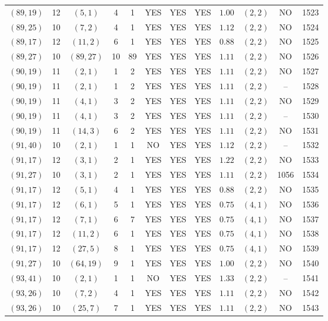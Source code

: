 \begin{longtable}{|c|c|c|c|c|c|c|c|c|c|c|c|}
$(89,19)$ & 12 & $(5,1)$ & 4 & 1 & YES & YES & YES & $1.00$ & $(2,2)$ & NO & 1523\\
$(89,25)$ & 10 & $(7,2)$ & 4 & 1 & YES & YES & YES & $1.12$ & $(2,2)$ & NO & 1524\\
$(89,17)$ & 12 & $(11,2)$ & 6 & 1 & YES & YES & YES & $0.88$ & $(2,2)$ & NO & 1525\\
$(89,27)$ & 10 & $(89,27)$ & 10 & 89 & YES & YES & YES & $1.11$ & $(2,2)$ & NO & 1526\\
$(90,19)$ & 11 & $(2,1)$ & 1 & 2 & YES & YES & YES & $1.11$ & $(2,2)$ & NO & 1527\\
$(90,19)$ & 11 & $(2,1)$ & 1 & 2 & YES & YES & YES & $1.11$ & $(2,2)$ & -- & 1528\\
$(90,19)$ & 11 & $(4,1)$ & 3 & 2 & YES & YES & YES & $1.11$ & $(2,2)$ & NO & 1529\\
$(90,19)$ & 11 & $(4,1)$ & 3 & 2 & YES & YES & YES & $1.11$ & $(2,2)$ & -- & 1530\\
$(90,19)$ & 11 & $(14,3)$ & 6 & 2 & YES & YES & YES & $1.11$ & $(2,2)$ & NO & 1531\\
$(91,40)$ & 10 & $(2,1)$ & 1 & 1 & NO & YES & YES & $1.12$ & $(2,2)$ & -- & 1532\\
$(91,17)$ & 12 & $(3,1)$ & 2 & 1 & YES & YES & YES & $1.22$ & $(2,2)$ & NO & 1533\\
$(91,27)$ & 10 & $(3,1)$ & 2 & 1 & YES & YES & YES & $1.11$ & $(2,2)$ & 1056 & 1534\\
$(91,17)$ & 12 & $(5,1)$ & 4 & 1 & YES & YES & YES & $0.88$ & $(2,2)$ & NO & 1535\\
$(91,17)$ & 12 & $(6,1)$ & 5 & 1 & YES & YES & YES & $0.75$ & $(4,1)$ & NO & 1536\\
$(91,17)$ & 12 & $(7,1)$ & 6 & 7 & YES & YES & YES & $0.75$ & $(4,1)$ & NO & 1537\\
$(91,17)$ & 12 & $(11,2)$ & 6 & 1 & YES & YES & YES & $0.75$ & $(4,1)$ & NO & 1538\\
$(91,17)$ & 12 & $(27,5)$ & 8 & 1 & YES & YES & YES & $0.75$ & $(4,1)$ & NO & 1539\\
$(91,27)$ & 10 & $(64,19)$ & 9 & 1 & YES & YES & YES & $1.00$ & $(2,2)$ & NO & 1540\\
$(93,41)$ & 10 & $(2,1)$ & 1 & 1 & NO & YES & YES & $1.33$ & $(2,2)$ & -- & 1541\\
$(93,26)$ & 10 & $(7,2)$ & 4 & 1 & YES & YES & YES & $1.11$ & $(2,2)$ & NO & 1542\\
$(93,26)$ & 10 & $(25,7)$ & 7 & 1 & YES & YES & YES & $1.11$ & $(2,2)$ & NO & 1543\\

\end{longtable}
